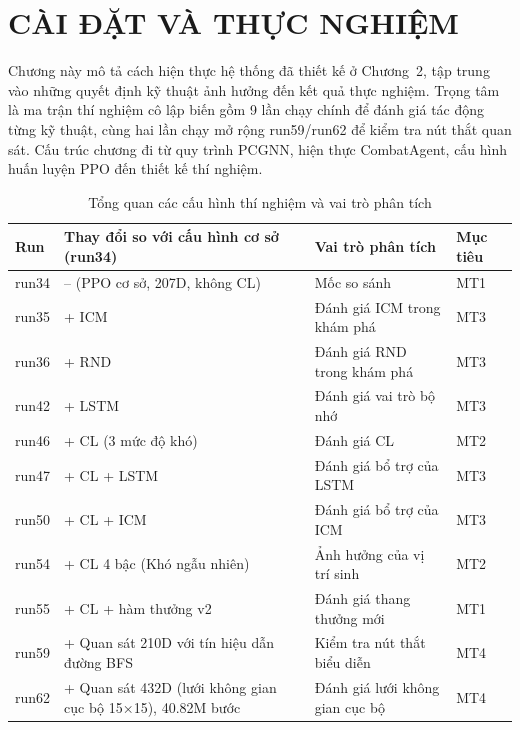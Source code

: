 \clearpage
{}

\setcounter{chapter}{2}
\chapter[CÀI ĐẶT VÀ THỰC NGHIỆM]{CÀI ĐẶT VÀ THỰC NGHIỆM}
Chương này mô tả cách hiện thực hệ thống đã thiết kế ở Chương~2, tập trung vào những quyết định kỹ thuật ảnh hưởng đến kết quả thực nghiệm. Trọng tâm là ma trận thí nghiệm cô lập biến gồm 9 lần chạy chính để đánh giá tác động từng kỹ thuật, cùng hai lần chạy mở rộng run59/run62 để kiểm tra nút thắt quan sát. Cấu trúc chương đi từ quy trình PCGNN, hiện thực CombatAgent, cấu hình huấn luyện PPO đến thiết kế thí nghiệm.
\begin{table}[H]
    \centering
    \small
    \caption{Tổng quan các cấu hình thí nghiệm và vai trò phân tích}
    \label{tab:experiment_roadmap}
    \begin{tabular}{|p{1.4cm}|p{4.8cm}|p{4.5cm}|p{3.0cm}|}
        \hline
        \textbf{Run} & \textbf{Thay đổi so với cấu hình cơ sở (run34)} & \textbf{Vai trò phân tích} & \textbf{Mục tiêu} \\
        \hline
        run34 & -- (PPO cơ sở, 207D, không CL) & Mốc so sánh & MT1 \\
        \hline
        run35 & + ICM & Đánh giá ICM trong khám phá & MT3 \\
        \hline
        run36 & + RND & Đánh giá RND trong khám phá & MT3 \\
        \hline
        run42 & + LSTM & Đánh giá vai trò bộ nhớ & MT3 \\
        \hline
        run46 & + CL (3 mức độ khó) & Đánh giá CL & MT2 \\
        \hline
        run47 & + CL + LSTM & Đánh giá bổ trợ của LSTM & MT3 \\
        \hline
        run50 & + CL + ICM & Đánh giá bổ trợ của ICM & MT3 \\
        \hline
        run54 & + CL 4 bậc (Khó ngẫu nhiên) & Ảnh hưởng của vị trí sinh & MT2 \\
        \hline
        run55 & + CL + hàm thưởng v2 & Đánh giá thang thưởng mới & MT1 \\
        \hline
        run59 & + Quan sát 210D với tín hiệu dẫn đường BFS & Kiểm tra nút thắt biểu diễn & MT4 \\
        \hline
        run62 & + Quan sát 432D (lưới không gian cục bộ 15×15), 40.82M bước & Đánh giá lưới không gian cục bộ & MT4 \\
        \hline
    \end{tabular}
\end{table}

